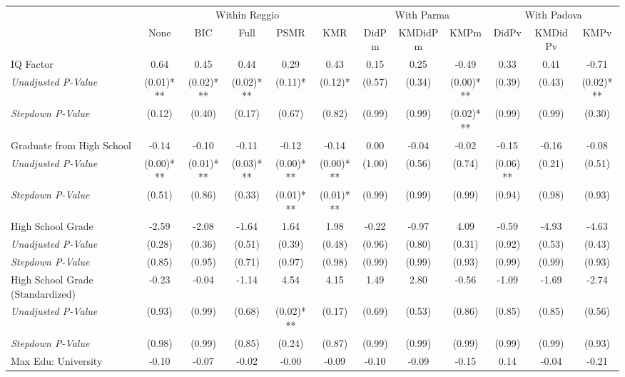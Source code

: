 \begin{tabular}{l c c c c c c c c c c c}
\toprule
& \multicolumn{5}{c}{Within Reggio} & \multicolumn{3}{c}{With Parma} & \multicolumn{3}{c}{With Padova} \\\cmidrule(lr){2-6} \cmidrule(lr){7-9} \cmidrule(lr){10-12}
 & None & BIC & Full & PSMR & KMR & DidPm & KMDidPm & KMPm & DidPv & KMDidPv & KMPv \\
\midrule
IQ Factor & 0.64 & 0.45 & 0.44 & 0.29 & 0.43 & 0.15 & 0.25 & -0.49 & 0.33 & 0.41 & -0.71 \\
\quad \textit{Unadjusted P-Value} & (0.01)*** & (0.02)*** & (0.02)*** & (0.11)* & (0.12)* & (0.57) & (0.34) & (0.00)*** & (0.39) & (0.43) & (0.02)*** \\
\quad \textit{Stepdown P-Value} & (0.12) & (0.40) & (0.17) & (0.67) & (0.82) & (0.99) & (0.99) & (0.02)*** & (0.99) & (0.99) & (0.30) \\
Graduate from High School & -0.14 & -0.10 & -0.11 & -0.12 & -0.14 & 0.00 & -0.04 & -0.02 & -0.15 & -0.16 & -0.08 \\
\quad \textit{Unadjusted P-Value} & (0.00)*** & (0.01)*** & (0.03)*** & (0.00)*** & (0.00)*** & (1.00) & (0.56) & (0.74) & (0.06)** & (0.21) & (0.51) \\
\quad \textit{Stepdown P-Value} & (0.51) & (0.86) & (0.33) & (0.01)*** & (0.01)*** & (0.99) & (0.99) & (0.99) & (0.94) & (0.98) & (0.93) \\
High School Grade & -2.59 & -2.08 & -1.64 & 1.64 & 1.98 & -0.22 & -0.97 & 4.09 & -0.59 & -4.93 & -4.63 \\
\quad \textit{Unadjusted P-Value} & (0.28) & (0.36) & (0.51) & (0.39) & (0.48) & (0.96) & (0.80) & (0.31) & (0.92) & (0.53) & (0.43) \\
\quad \textit{Stepdown P-Value} & (0.85) & (0.95) & (0.71) & (0.97) & (0.98) & (0.99) & (0.99) & (0.93) & (0.99) & (0.99) & (0.93) \\
High School Grade (Standardized) & -0.23 & -0.04 & -1.14 & 4.54 & 4.15 & 1.49 & 2.80 & -0.56 & -1.09 & -1.69 & -2.74 \\
\quad \textit{Unadjusted P-Value} & (0.93) & (0.99) & (0.68) & (0.02)*** & (0.17) & (0.69) & (0.53) & (0.86) & (0.85) & (0.85) & (0.56) \\
\quad \textit{Stepdown P-Value} & (0.98) & (0.99) & (0.85) & (0.24) & (0.87) & (0.99) & (0.99) & (0.99) & (0.99) & (0.99) & (0.93) \\
Max Edu: University & -0.10 & -0.07 & -0.02 & -0.00 & -0.09 & -0.10 & -0.09 & -0.15 & 0.14 & -0.04 & -0.21 \\

\end{tabular}
